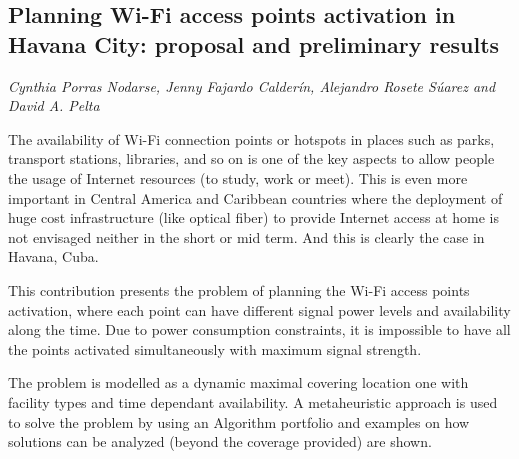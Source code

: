 \documentclass[../booklet.tex]{subfiles}
\begin{document}
\subsection[Planning Wi-Fi access points activation in Havana City: proposal and preliminary results. {\it Cynthia Porras Nodarse, Jenny Fajardo Calderín, Alejandro Rosete Súarez and David A. Pelta}]{Planning Wi-Fi access points activation in Havana City: proposal and preliminary results}
   

\begin{center}
  {\it Cynthia Porras Nodarse, Jenny Fajardo Calderín, Alejandro Rosete Súarez and David A. Pelta}
\end{center}



The availability of Wi-Fi connection points or hotspots in places such as parks, transport stations, libraries, and so on is one of the key aspects to allow people the usage of Internet resources (to study, work or meet).
This is even more important in Central America and Caribbean countries where the deployment of huge cost infrastructure (like optical fiber) to provide Internet access at home is not envisaged neither in the short or mid term. And this is clearly the case in Havana, Cuba. 

This contribution presents the problem of planning the Wi-Fi access points activation, where each point can have different signal power levels and availability along the time. Due to power consumption constraints, it is impossible to have all the points activated simultaneously with maximum signal strength.

The problem is modelled as a dynamic maximal covering location one with facility types and time dependant availability. A metaheuristic approach is used to solve the problem by using an Algorithm portfolio and examples on how solutions can be analyzed (beyond the coverage provided)  are shown.

\end{document}
